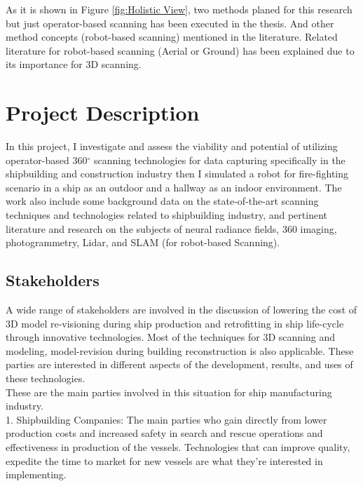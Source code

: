 \noindent As it is shown in Figure \ref{fig:Holistic View}, two methods planed for this research but just operator-based scanning has been executed in the thesis. And other method concepts (robot-based scanning) mentioned in the literature. Related literature for robot-based scanning (Aerial or Ground) has been explained due to its importance for 3D scanning. 






\section{Project Description}

In this project, I investigate and assess the viability and potential of utilizing operator-based 360$^{\circ}$ scanning technologies for data capturing specifically in the shipbuilding and construction industry then I simulated a robot for fire-fighting scenario in a ship as an outdoor and a hallway as an indoor environment. The work also include some background data on the state-of-the-art scanning techniques and technologies related to shipbuilding industry, and pertinent literature and research on the subjects of neural radiance fields, 360 imaging, photogrammetry, Lidar, and SLAM (for robot-based Scanning).

\subsection{Stakeholders}
A wide range of stakeholders are involved in the discussion of lowering the cost of 3D model re-visioning during ship production and retrofitting in ship life-cycle through innovative technologies. Most of the techniques for 3D scanning and modeling, model-revision during building reconstruction is also applicable. These parties are interested in different aspects of the development, results, and uses of these technologies.\\These are the main parties involved in this situation for ship manufacturing industry. \\

1. Shipbuilding Companies: The main parties who gain directly from lower production costs and increased safety in search and rescue operations and effectiveness in production of the vessels. Technologies that can improve quality, expedite the time to market for new vessels are what they're interested in implementing.\\

